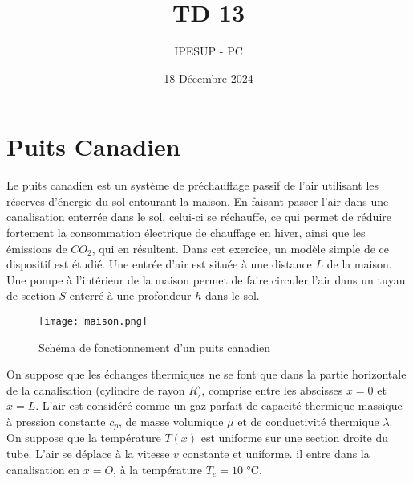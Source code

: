 \documentclass{article}
\title{TD 13}
\author{IPESUP - PC }
\date{18 Décembre 2024}
\begin{document}
\maketitle

\section{Puits Canadien} Le puits canadien est un système de préchauffage passif de l’air utilisant les réserves d’énergie
du sol entourant la maison. En faisant passer l’air dans une canalisation enterrée dans le
sol, celui-ci se réchauffe, ce qui permet de réduire fortement la consommation électrique de
chauffage en hiver, ainsi que les émissions de $CO_2$, qui en résultent. Dans cet exercice, un
modèle simple de ce dispositif est étudié.
Une entrée d'air est située à une distance $L$ de la maison. Une pompe à l’intérieur de la maison
permet de faire circuler l’air dans un tuyau de section $ S$ enterré à une profondeur $h$ dans le
sol. 



\begin{figure}[h]
  \centering
  \texttt{[image: maison.png]}
  \label{fig:maison}
    \caption{Schéma de fonctionnement d'un puits canadien}


\end{figure}


On suppose que les échanges thermiques ne se font que dans la partie horizontale de la canalisation (cylindre de rayon $ R$), comprise entre les abscisses $ x = 0$ et $ x = L$. L’air est considéré comme un gaz parfait de capacité thermique massique à pression constante $c_p$, de masse volumique $\mu$ et de conductivité thermique $\lambda$. On suppose que la température $ T (x)$ est uniforme sur une section droite du tube. L'air se déplace à la vitesse $ v $ constante et uniforme. il entre dans la canalisation  en $ x = O$, à la température $T_e = 10$ °C.
\end{document}
